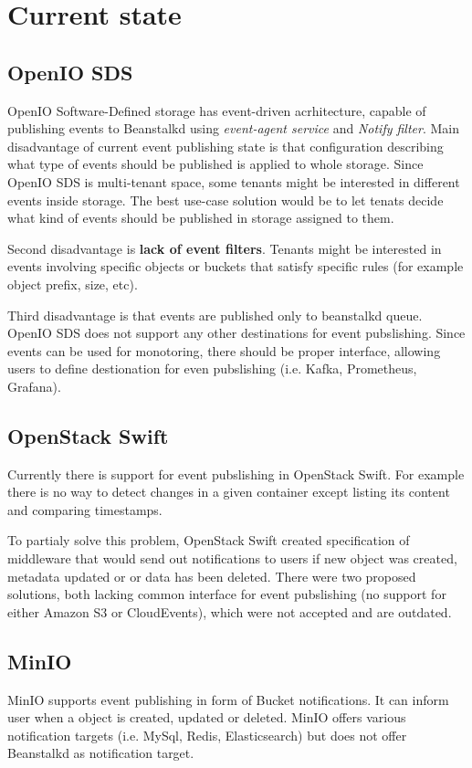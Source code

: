 \section{Current state}
    \subsection{OpenIO SDS}
    OpenIO Software-Defined storage has event-driven acrhitecture, capable of publishing events to Beanstalkd using \textit{event-agent service} and \textit{Notify filter}.
    Main disadvantage of current event publishing state is that configuration describing what type of events should be published is applied to whole storage. Since OpenIO SDS is multi-tenant space, some tenants might be interested in different events inside storage. The best use-case solution would be to let tenats decide what kind of events should be published in storage assigned to them.

    Second disadvantage is \textbf{lack of event filters}. Tenants might be interested in events involving specific objects or buckets that satisfy specific rules (for example object prefix, size, etc).

    Third disadvantage is that events are published only to beanstalkd queue. OpenIO SDS does not support any other destinations for event pubslishing. Since events can be used for monotoring, there should be proper interface, allowing users to define destionation for even pubslishing (i.e. Kafka, Prometheus, Grafana).

    \subsection{OpenStack Swift}
    Currently there is support for event pubslishing in OpenStack Swift. For example there is no way to detect changes in a given container except listing its content and comparing timestamps.

    To partialy solve this problem, OpenStack Swift created specification of middleware that would send out notifications to users if new object was created, metadata updated or or data has been deleted.
    There were two proposed solutions, both lacking common interface for event pubslishing (no support for either Amazon S3 or CloudEvents), which were not accepted and are outdated.

    \subsection{MinIO}
    MinIO supports event publishing in form of Bucket notifications. It can inform user when a object is created, updated or deleted. MinIO offers various notification targets (i.e. MySql, Redis, Elasticsearch) but does not offer Beanstalkd as notification target.

